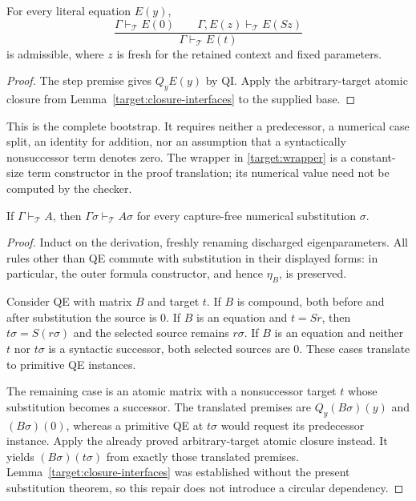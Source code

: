 \begin{corollary}
\label{target:equation-induction}
For every literal equation $E(y)$,
\[
 \frac{\Gamma\vdash_{\mathcal T}E(0)
       \qquad\Gamma,E(z)\vdash_{\mathcal T}E(Sz)}
      {\Gamma\vdash_{\mathcal T}E(t)}
\]
is admissible, where $z$ is fresh for the retained context and fixed
parameters.
\end{corollary}
\begin{proof}
The step premise gives $Q_yE(y)$ by QI.  Apply the arbitrary-target atomic
closure from Lemma~\ref{target:closure-interfaces} to the supplied base.
\end{proof}

This is the complete bootstrap.  It requires neither a predecessor, a
numerical case split, an identity for addition, nor an assumption that a
syntactically nonsuccessor term denotes zero.  The wrapper in
\eqref{target:wrapper} is a constant-size term constructor in the proof
translation; its numerical value need not be computed by the checker.

\begin{lemma}
\label{target:substitution}
If $\Gamma\vdash_{\mathcal T}A$, then
$\Gamma\sigma\vdash_{\mathcal T}A\sigma$ for every capture-free numerical
substitution $\sigma$.
\end{lemma}
\begin{proof}
Induct on the derivation, freshly renaming discharged eigenparameters.
All rules other than QE commute with substitution in their displayed forms:
in particular, the outer formula constructor, and hence $\eta_B$, is
preserved.

Consider QE with matrix $B$ and target $t$.  If $B$ is compound, both before
and after substitution the source is $0$.  If $B$ is an equation and
$t=Sr$, then $t\sigma=S(r\sigma)$ and the selected source remains
$r\sigma$.  If $B$ is an equation and neither $t$ nor $t\sigma$ is a
syntactic successor, both selected sources are $0$.  These cases translate
to primitive QE instances.

The remaining case is an atomic matrix with a nonsuccessor target $t$
whose substitution becomes a successor.  The translated premises are
$Q_y(B\sigma)(y)$ and $(B\sigma)(0)$, whereas a primitive QE at $t\sigma$
would request its predecessor instance.  Apply the already proved
arbitrary-target atomic closure instead.  It yields $(B\sigma)(t\sigma)$
from exactly those translated premises.  Lemma~\ref{target:closure-interfaces}
was established without the present substitution theorem, so this repair
does not introduce a circular dependency.
\end{proof}

